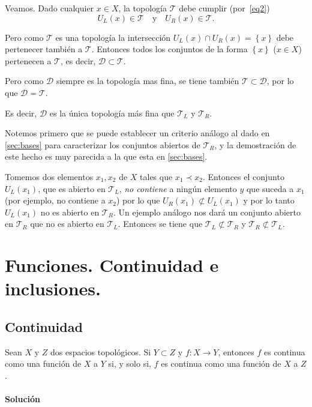 \documentclass[a5paper,10pt,final]{extarticle}
\let\footnote\null
\begin{document}
Veamos. Dado cualquier $x\in X$, la topología $\mathcal{T}$ debe cumplir (por~\ref{eq2})
\[
U_L(x)\in\mathcal{T}\quad\text{y}\quad U_R(x)\in\mathcal{T}.
\]

Pero como $\mathcal{T}$ es una topología la intersección $U_L(x)\cap U_R(x)=\left\{ x \right\}$ debe pertenecer también a $\mathcal{T}.$
Entonces todos los conjuntos de la forma $\left\{ x \right\}$ ($x\in X$) pertenecen a $\mathcal{T}$, es decir, $\mathcal{D}\subset\mathcal{T}$.

Pero como $\mathcal{D}$ siempre es la topología mas fina, se tiene también $\mathcal{T}\subset\mathcal{D}$, por lo que
$\mathcal{D}=\mathcal{T}$.

Es decir, $\mathcal{D}$ es la única topología más fina que $\mathcal{T}_L$ y $\mathcal{T}_R$.

Notemos primero que se puede establecer un criterio análogo al dado en \ref{sec:bases}
para caracterizar los conjuntos abiertos de $\mathcal{T}_R$, y la demostración de este hecho
es muy parecida a la que esta en \ref{sec:bases}.

Tomemos dos elementos $x_1,x_2$ de $X$ tales que $x_1\prec x_2$. Entonces el conjunto $U_L(x_1)$, que
es abierto en $\mathcal{T}_L$, \emph{no contiene} a ningún elemento $y$ que suceda a $x_1$ (por ejemplo,
no contiene a $x_2$) por lo que $U_R(x_1)\not\subset U_L(x_1)$ y por lo tanto $U_L(x_1)$ no es abierto
en $\mathcal{T}_R$. Un ejemplo análogo nos dará un conjunto abierto en $\mathcal{T}_R$ que no es abierto
en $\mathcal{T}_L$. Entonces se tiene que $\mathcal{T}_L\not\subset\mathcal{T}_R$ y $\mathcal{T}_R\not\subset\mathcal{T}_L$.

\section{Funciones. Continuidad e inclusiones.}\label{sec:fun}

\subsection{Continuidad}

Sean $X$ y $Z$ dos espacios topológicos. Si $Y\subset Z$ y $f\colon X\to Y$, entonces $f$ es continua como una función de $X$ a $Y$ si, y solo si, $f$ es continua como una función de $X$ a $Z$.%

\paragraph{Solución}
\end{document}
